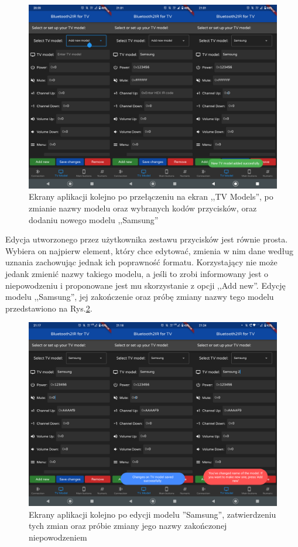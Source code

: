 \documentclass[12pt,twoside]{article}
\begin{document}
\begin{figure}[ht]
   \centering
   \includegraphics[width=14cm]{images/addingSamsung.png}
   \caption{Ekrany aplikacji kolejno po przełączeniu na ekran ,,TV Models'', po zmianie nazwy modelu oraz wybranych kodów przycisków, oraz dodaniu nowego modelu ,,Samsung''}
   \label{Fig:addingSamsung}
\end{figure}

Edycja utworzonego przez użytkownika zestawu przycisków jest równie prosta. Wybiera on najpierw element, który chce edytować, zmienia w nim dane według uznania zachowując jednak ich poprawność formatu. Korzystający nie może jedank zmienić nazwy takiego modelu, a jeśli to zrobi informowany jest o niepowodzeniu i proponowane jest mu skorzystanie z opcji ,,Add new''. Edycję modelu ,,Samsung'', jej zakończenie oraz  próbę zmiany nazwy tego modelu przedstawiono na Rys.\ref*{Fig:changingSamsung}.

\begin{figure}[ht]
   \centering
   \includegraphics[width=14cm]{images/changingSamsung.png}
   \caption{Ekrany aplikacji kolejno po edycji modelu ''Samsung'', zatwierdzeniu tych zmian oraz próbie zmiany jego nazwy zakończonej niepowodzeniem}
   \label{Fig:changingSamsung}
\end{figure}
\end{document}
